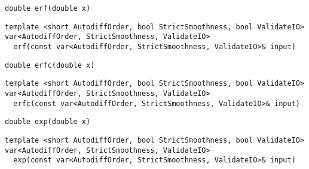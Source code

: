 \begin{tcolorbox}[colback=white,colframe=gray90, coltitle=black,boxrule=3pt,
fonttitle=\bfseries,title= Erf]

\begin{verbatim}
double erf(double x)

\end{verbatim}

\begin{verbatim}
template <short AutodiffOrder, bool StrictSmoothness, bool ValidateIO>
var<AutodiffOrder, StrictSmoothness, ValidateIO>
  erf(const var<AutodiffOrder, StrictSmoothness, ValidateIO>& input)

\end{verbatim}

\end{tcolorbox}

\begin{tcolorbox}[colback=white,colframe=gray90, coltitle=black,boxrule=3pt,
fonttitle=\bfseries,title= Erfc]

\begin{verbatim}
double erfc(double x)

\end{verbatim}

\begin{verbatim}
template <short AutodiffOrder, bool StrictSmoothness, bool ValidateIO>
var<AutodiffOrder, StrictSmoothness, ValidateIO>
  erfc(const var<AutodiffOrder, StrictSmoothness, ValidateIO>& input)

\end{verbatim}

\end{tcolorbox}

\begin{tcolorbox}[colback=white,colframe=gray90, coltitle=black,boxrule=3pt,
fonttitle=\bfseries,title= Exp]

\begin{verbatim}
double exp(double x)

\end{verbatim}

\begin{verbatim}
template <short AutodiffOrder, bool StrictSmoothness, bool ValidateIO>
var<AutodiffOrder, StrictSmoothness, ValidateIO>
  exp(const var<AutodiffOrder, StrictSmoothness, ValidateIO>& input)

\end{verbatim}

\end{tcolorbox}

